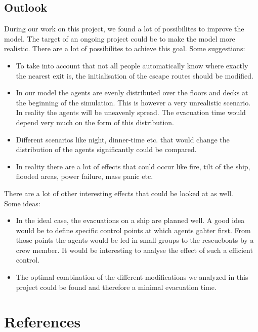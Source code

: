 \documentclass[11pt]{article}
\begin{document}
\subsection{Outlook}
During our work on this project, we found a lot of possibilites to improve the model. The target of an ongoing project could be to make the model more realistic. There are a lot of possibilites to achieve this goal.
\newline
Some suggestions:
\begin{itemize}
\item To take into account that not all people automatically know where exactly the nearest exit is, the initialisation of the escape routes should be modified.
\item In our model the agents are evenly distributed over the floors and decks at the beginning of the simulation. This is however a very unrealistic scenario. In reality the agents will be uneavenly spread. The evacuation time would depend very much on the form of this distribution.
\item Different scenarios like night, dinner-time etc. that would change the distribution of the agents significantly could be compared.
\item In reality there are a lot of effects that could occur like fire, tilt of the ship, flooded areas, power failure, mass panic etc.
\end{itemize}
There are a lot of other interesting effects that could be looked at as well.
\\
Some ideas:
\begin{itemize}
\item In the ideal case, the evacuations on a ship are planned well. A good idea would be to define specific control points at which agents gahter first. From those points the agents would be led in small groups to the rescueboats by a crew member. It would be interesting to analyse the effect of such a efficient control.
\item The optimal combination of the different modifications we analyzed in this project could be found and therefore a minimal evacuation time.
\end{itemize}
\section{References}
\end{document}
